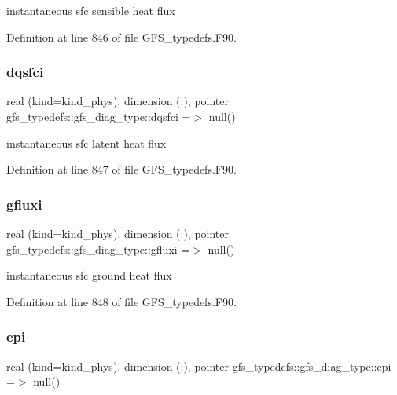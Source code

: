 instantaneous sfc sensible heat flux 



Definition at line 846 of file G\+F\+S\+\_\+typedefs.\+F90.

\mbox{\label{structgfs__typedefs_1_1gfs__diag__type_af357e5e7aa3d4193cebd2db9a97d18d6}} 
\subsubsection{dqsfci}
{\footnotesize\ttfamily real (kind=kind\+\_\+phys), dimension (\+:), pointer gfs\+\_\+typedefs\+::gfs\+\_\+diag\+\_\+type\+::dqsfci =$>$ null()}



instantaneous sfc latent heat flux 



Definition at line 847 of file G\+F\+S\+\_\+typedefs.\+F90.

\mbox{\label{structgfs__typedefs_1_1gfs__diag__type_a285c6278fc1fac8d8b99e7477934af5b}} 
\subsubsection{gfluxi}
{\footnotesize\ttfamily real (kind=kind\+\_\+phys), dimension (\+:), pointer gfs\+\_\+typedefs\+::gfs\+\_\+diag\+\_\+type\+::gfluxi =$>$ null()}



instantaneous sfc ground heat flux 



Definition at line 848 of file G\+F\+S\+\_\+typedefs.\+F90.

\mbox{\label{structgfs__typedefs_1_1gfs__diag__type_a869a421f13a696a0a1d49c7de50b93e5}} 
\subsubsection{epi}
{\footnotesize\ttfamily real (kind=kind\+\_\+phys), dimension    (\+:), pointer gfs\+\_\+typedefs\+::gfs\+\_\+diag\+\_\+type\+::epi =$>$ null()}



